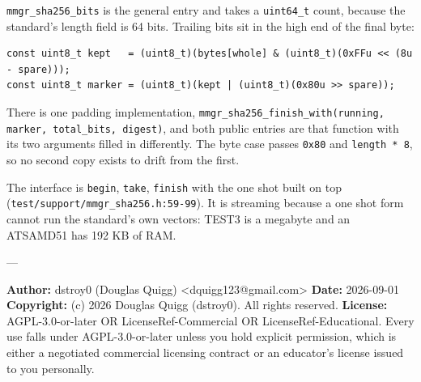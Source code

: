 \texttt{mmgr\_\allowbreak{}sha256\_\allowbreak{}bits} is the general entry and takes a \texttt{uint64\_\allowbreak{}t} count, because the standard's length field is 64 bits. Trailing bits sit in the high end of the final byte:

\begin{lstlisting}[breaklines=true,breakatwhitespace=false,basicstyle=\ttfamily\small]
const uint8_t kept   = (uint8_t)(bytes[whole] & (uint8_t)(0xFFu << (8u - spare)));
const uint8_t marker = (uint8_t)(kept | (uint8_t)(0x80u >> spare));
\end{lstlisting}

There is one padding implementation, \texttt{mmgr\_\allowbreak{}sha256\_\allowbreak{}finish\_\allowbreak{}with(running, marker, total\_\allowbreak{}bits, digest)}, and both public entries are that function with its two arguments filled in differently. The byte case passes \texttt{0x80} and \texttt{length * 8}, so no second copy exists to drift from the first.

The interface is \texttt{begin}, \texttt{take}, \texttt{finish} with the one shot built on top (\texttt{test/\allowbreak{}support/\allowbreak{}mmgr\_\allowbreak{}sha256.\allowbreak{}h:59-\allowbreak{}99}). It is streaming because a one shot form cannot run the standard's own vectors: TEST3 is a megabyte and an ATSAMD51 has 192 KB of RAM.

---

\textbf{Author:} dstroy0 (Douglas Quigg) <dquigg123@gmail.com> \textbf{Date:} 2026-09-01 \textbf{Copyright:} (c) 2026 Douglas Quigg (dstroy0). All rights reserved. \textbf{License:} AGPL-3.0-or-later OR LicenseRef-Commercial OR LicenseRef-Educational. Every use falls under AGPL-3.0-or-later unless you hold explicit permission, which is either a negotiated commercial licensing contract or an educator's license issued to you personally.

